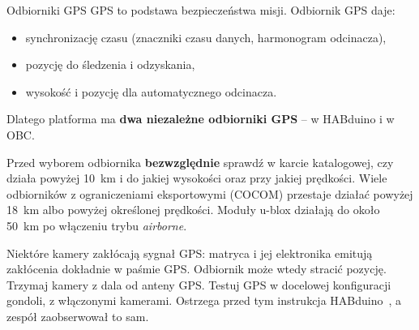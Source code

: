 \begin{sekcja}{Odbiorniki GPS}
GPS to podstawa bezpieczeństwa misji. Odbiornik GPS daje:
\begin{itemize}
  \item synchronizację czasu (znaczniki czasu danych, harmonogram odcinacza),
  \item pozycję do śledzenia i odzyskania,
  \item wysokość i pozycję dla automatycznego odcinacza.
\end{itemize}
Dlatego platforma ma \textbf{dwa niezależne odbiorniki GPS} -- w HABduino i w OBC.

\begin{uwaga}Przed wyborem odbiornika \textbf{bezwzględnie} sprawdź w karcie katalogowej, czy działa powyżej \SI{10}{km} i do jakiej wysokości oraz przy jakiej prędkości. Wiele odbiorników z ograniczeniami eksportowymi (COCOM) przestaje działać powyżej \SI{18}{km} albo powyżej określonej prędkości. Moduły u-blox działają do około \SI{50}{km} po włączeniu trybu \emph{airborne}.\end{uwaga}

\begin{uwaga}Niektóre kamery zakłócają sygnał GPS: matryca i jej elektronika emitują zakłócenia dokładnie w paśmie GPS. Odbiornik może wtedy stracić pozycję. Trzymaj kamery z dala od anteny GPS. Testuj GPS w docelowej konfiguracji gondoli, z włączonymi kamerami. Ostrzega przed tym instrukcja HABduino~\cite{habduino}, a zespół zaobserwował to sam.\end{uwaga}
\end{sekcja}

